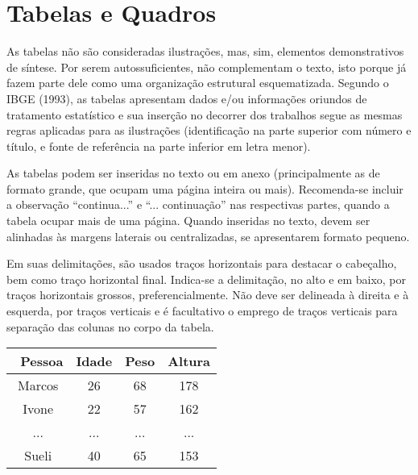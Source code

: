 \documentclass[12pt,oneside,a4paper,chapter=TITLE,section=TITLE,sumario=tradicional]{abntex2}
\begin{document}
\section{Tabelas e Quadros}
\label{sec:tabelas}

As tabelas não são consideradas ilustrações, mas, sim, elementos demonstrativos 
de síntese. Por serem autossuficientes, não complementam o texto, isto porque 
já fazem parte dele como uma organização estrutural esquematizada. Segundo o 
IBGE (1993), as tabelas apresentam dados e/ou informações oriundos de 
tratamento estatístico e sua inserção no decorrer dos trabalhos segue as mesmas 
regras aplicadas para as ilustrações (identificação na parte superior com 
número e título, e fonte de referência na parte inferior em letra menor).

As tabelas podem ser inseridas no texto ou em anexo (principalmente as de 
formato grande, que ocupam uma página inteira ou mais). Recomenda-se incluir a 
observação ``continua...'' e ``... continuação'' nas respectivas partes, quando 
a tabela ocupar mais de uma página. Quando inseridas no texto, devem ser 
alinhadas às margens laterais ou centralizadas, se apresentarem formato pequeno.

Em suas delimitações, são usados traços horizontais para destacar o cabeçalho, 
bem como traço horizontal final. Indica-se a delimitação, no alto e em baixo, 
por traços horizontais grossos, preferencialmente. Não deve ser delineada à 
direita e à esquerda, por traços verticais e é facultativo o emprego de traços 
verticais para separação das colunas no corpo da tabela.

\begin{table}[htb]
    \begin{tabular}{c|ccc}
        \hline\
        \textbf{Pessoa} & \textbf{Idade} & \textbf{Peso} & \textbf{Altura} \\ 
        \hline\hline
        Marcos & 26    & 68   & 178    \\ 
        Ivone  & 22    & 57   & 162    \\ 
        ...    & ...   & ...  & ...    \\ 
        Sueli  & 40    & 65   & 153    \\ \hline
    \end{tabular}
    
    \fonteautor
\end{table}
 
\end{document}
